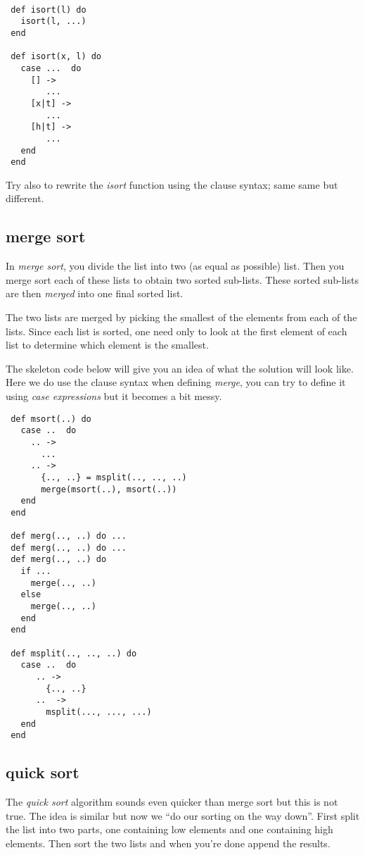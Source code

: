 \documentclass[a4paper,11pt]{article}
\begin{document}
\begin{verbatim}

 def isort(l) do 
   isort(l, ...)
 end

 def isort(x, l) do
   case ...  do
     [] -> 
        ...
     [x|t] ->
        ...
     [h|t] ->
        ...
   end
 end
\end{verbatim}

Try also to rewrite the {\em isort} function using the clause syntax;
same same but different.


\subsection{merge sort}

In {\em merge sort}, you divide the list into two (as equal as
possible) list. Then you merge sort each of these lists to obtain two
sorted sub-lists. These sorted sub-lists are then {\em merged} into
one final sorted list. 

The two lists are merged by picking the smallest of the elements from
each of the lists. Since each list is sorted, one need only to look at
the first element of each list to determine which element is the
smallest.

The skeleton code below will give you an idea of what the solution
will look like. Here we do use the clause syntax when defining {\em
  merge}, you can try to define it using {\em case expressions} but it
becomes a bit messy.

\begin{verbatim}
 def msort(..) do
   case ..  do
     .. -> 
       ...
     .. ->
       {.., ..} = msplit(.., .., ..)
       merge(msort(..), msort(..))
   end
 end

 def merg(.., ..) do ...
 def merg(.., ..) do ...
 def merg(.., ..) do
   if ... 
     merge(.., ..)
   else 
     merge(.., ..)
   end
 end

 def msplit(.., .., ..) do
   case ..  do
      .. -> 
        {.., ..}
      ..  ->
        msplit(..., ..., ...)
   end
 end
\end{verbatim}

\subsection{quick sort}

The {\em quick sort} algorithm sounds even quicker than merge sort but
this is not true. The idea is similar but now we ``do our sorting on
the way down''. First split the list into two parts, one containing low
elements and one containing high elements. Then sort the two lists and
when you're done append the results. 
\end{document}
